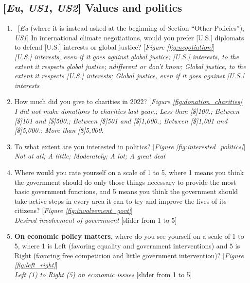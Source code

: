 \documentclass[12pt,english]{article}
\begin{document}
\subsection*{[\textit{Eu}, \textit{US1}, \textit{US2}] Values and politics}
\begin{enumerate}[resume] \item ~[\textit{Eu} (where it is instead asked at the beginning of Section ``Other Policies''), \textit{US1}] \label{q:negotiation} In international climate negotiations, would you prefer [U.S.] diplomats to defend [U.S.] interests or global justice? [\textit{Figure \ref{fig:negotiation}}]
\\ \textit{[U.S.] interests, even if it goes against global justice; [U.S.] interests, to the extent it respects global justice; ndifferent or don't know; Global justice, to the extent it respects [U.S.] interests; Global justice, even if it goes against [U.S.] interests}
\item \label{q:donation_charities} How much did you give to charities in 2022? [\textit{Figure \ref{fig:donation_charities}}]
\\ \textit{I did not make donations to charities last year.; Less than [\$]100.; Between [\$]101 and [\$]500.; Between [\$]501 and [\$]1,000.; Between [\$]1,001 and [\$]5,000.; More than [\$]5,000.}
\item \label{q:interested_politics} To what extent are you interested in politics? [\textit{Figure \ref{fig:interested_politics}}]
\\ \textit{Not at all; A little; Moderately; A lot; A great deal}
\item \label{q:involvement_govt} Where would you rate yourself on a scale of 1 to 5, where 1 means you think the government should do only those things necessary to provide the most basic government functions, and 5 means you think the government should take active steps in every area it can to try and improve the lives of its citizens? [\textit{Figure \ref{fig:involvement_govt}}]
\\ \textit{Desired involvement of government} [slider from 1 to 5]
\item \label{q:left_right} \textbf{On economic policy matters}, where do you see yourself on a scale of 1 to 5, where 1 is Left (favoring equality and government interventions) and 5 is Right (favoring free competition and little government intervention)? [\textit{Figure \ref{fig:left_right}}]
\\ \textit{Left (1) to Right (5) on economic issues} [slider from 1 to 5]

\end{enumerate}
\end{document}

